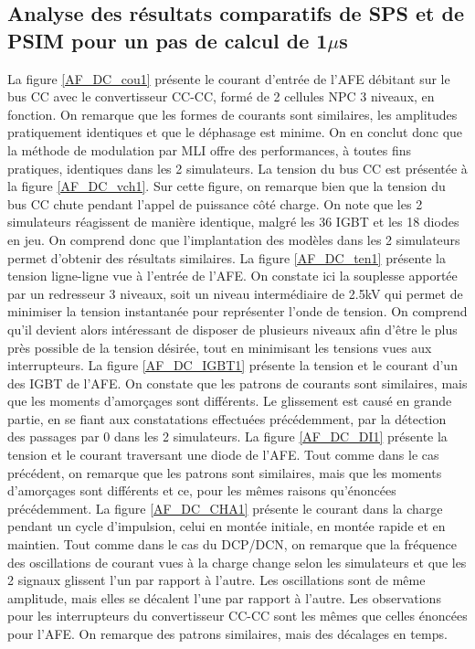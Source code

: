 \subsection{Analyse des résultats comparatifs de SPS et de PSIM pour un pas de calcul de 1$\mu$s}
La figure \ref{AF_DC_cou1} présente le courant d'entrée de l'AFE débitant sur le bus CC avec le convertisseur CC-CC, formé de 2 cellules NPC 3 niveaux, en fonction. On remarque que les formes de courants sont similaires, les amplitudes pratiquement identiques et que le déphasage est minime. On en conclut donc que la méthode de modulation par MLI offre des performances, à toutes fins pratiques, identiques dans les 2 simulateurs.
La tension du bus CC est présentée à la figure \ref{AF_DC_vch1}. Sur cette figure, on remarque bien que la tension du bus CC chute pendant l'appel de puissance côté charge. On note que les 2 simulateurs réagissent de manière identique, malgré les 36 IGBT et les 18 diodes en jeu. On comprend donc que l'implantation des modèles dans les 2 simulateurs permet d'obtenir des résultats similaires. 
La figure \ref{AF_DC_ten1} présente la tension ligne-ligne vue à l'entrée de l'AFE. On constate ici la souplesse apportée par un redresseur 3 niveaux, soit un niveau intermédiaire de 2.5kV qui permet de minimiser la tension instantanée pour représenter l'onde de tension. On comprend qu'il devient alors intéressant de disposer de plusieurs niveaux afin d'être le plus près possible de la tension désirée, tout en minimisant les tensions vues aux interrupteurs.
La figure \ref{AF_DC_IGBT1} présente la tension et le courant d'un des IGBT de l'AFE. On constate que les patrons de courants sont similaires, mais que les moments d'amorçages sont différents. Le glissement est causé en grande partie, en se fiant aux constatations effectuées précédemment, par la détection des passages par 0 dans les 2 simulateurs.
La figure \ref{AF_DC_DI1} présente la tension et le courant traversant une diode de l'AFE. Tout comme dans le cas précédent, on remarque que les patrons sont similaires, mais que les moments d'amorçages sont différents et ce, pour les mêmes raisons qu'énoncées précédemment.
La figure \ref{AF_DC_CHA1} présente le courant dans la charge pendant un cycle d'impulsion, celui en montée initiale, en montée rapide et en maintien. Tout comme dans le cas du DCP/DCN, on remarque que la fréquence des oscillations de courant vues à la charge change selon les simulateurs et que les 2 signaux glissent l'un par rapport à l'autre. Les oscillations sont de même amplitude, mais elles se décalent l'une par rapport à l'autre.
Les observations pour les interrupteurs du convertisseur CC-CC sont les mêmes que celles énoncées pour l'AFE. On remarque des patrons similaires, mais des décalages en temps.
